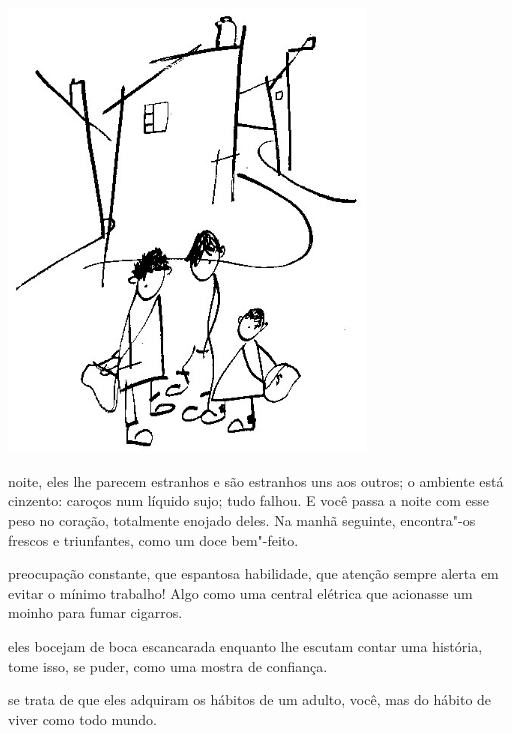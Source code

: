 \begin{vplace}[.50]
\begin{center}
\includegraphics[width=95mm]{./imgs/Image_7.jpg}
\end{center}
\end{vplace}

\bigskip
\bigskip

\pagebreak
\thispagestyle{empty}
\movetooddpage

 noite, eles lhe parecem estranhos e são estranhos uns aos outros; o
ambiente está cinzento: caroços num líquido sujo; tudo falhou. E você
passa a noite com esse peso no coração, totalmente enojado deles. Na
manhã seguinte, encontra"-os frescos e triunfantes, como um doce
bem"-feito.



 preocupação constante, que espantosa habilidade, que atenção sempre
alerta em evitar o mínimo trabalho! Algo como uma central elétrica que
acionasse um moinho para fumar cigarros.



 eles bocejam de boca escancarada enquanto lhe escutam contar uma
história, tome isso, se puder, como uma mostra de confiança.



 se trata de que eles adquiram os hábitos de um adulto, você, mas do
hábito de viver como todo mundo.



